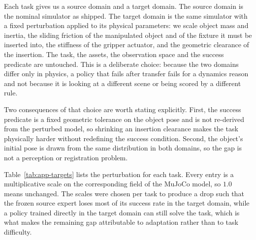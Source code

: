 \documentclass{article} %
\begin{document}
Each task gives us a source domain and a target domain. The source domain is the nominal simulator as shipped. The target domain is the same simulator with a fixed perturbation applied to its physical parameters: we scale object mass and inertia, the sliding friction of the manipulated object and of the fixture it must be inserted into, the stiffness of the gripper actuator, and the geometric clearance of the insertion. The task, the assets, the observation space and the success predicate are untouched. This is a deliberate choice: because the two domains differ only in physics, a policy that fails after transfer fails for a dynamics reason and not because it is looking at a different scene or being scored by a different rule.

Two consequences of that choice are worth stating explicitly. First, the success predicate is a fixed geometric tolerance on the object pose and is not re-derived from the perturbed model, so shrinking an insertion clearance makes the task physically harder without redefining the success condition. Second, the object's initial pose is drawn from the same distribution in both domains, so the gap is not a perception or registration problem.

Table~\ref{tab:app-targets} lists the perturbation for each task. Every entry is a multiplicative scale on the corresponding field of the MuJoCo model, so $1.0$ means unchanged. The scales were chosen per task to produce a drop such that the frozen source expert loses most of its success rate in the target domain, while a policy trained directly in the target domain can still solve the task, which is what makes the remaining gap attributable to adaptation rather than to task difficulty.
\end{document}
